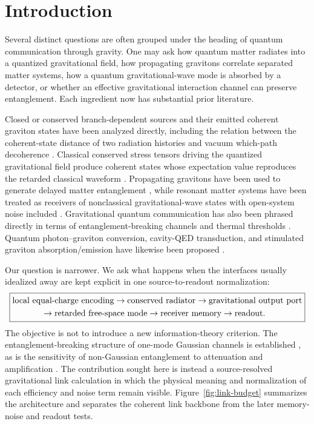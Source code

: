 \section{Introduction}

Several distinct questions are often grouped under the heading of quantum communication through gravity. One may ask how quantum matter radiates into a quantized gravitational field, how propagating gravitons correlate separated matter systems, how a quantum gravitational-wave mode is absorbed by a detector, or whether an effective gravitational interaction channel can preserve entanglement. Each ingredient now has substantial prior literature.

Closed or conserved branch-dependent sources and their emitted coherent graviton states have been analyzed directly, including the relation between the coherent-state distance of two radiation histories and vacuum which-path decoherence \cite{Matsui2026}. Classical conserved stress tensors driving the quantized gravitational field produce coherent states whose expectation value reproduces the retarded classical waveform \cite{LagaSuyama2026}. Propagating gravitons have been used to generate delayed matter entanglement \cite{TrengganaZen2026}, while resonant matter systems have been treated as receivers of nonclassical gravitational-wave states with open-system noise included \cite{ToccaceloEtAl2026,TobarEtAl2024}. Gravitational quantum communication has also been phrased directly in terms of entanglement-breaking channels and thermal thresholds \cite{MariEtAl2026,ToccaceloAndersenBrask2025,MikiLiChen2026}. Quantum photon--graviton conversion, cavity-QED transduction, and stimulated graviton absorption/emission have likewise been proposed \cite{IkedaEtAl2025,AraniLamineSoda2026,Schutzhold2025}.

Our question is narrower. We ask what happens when the interfaces usually idealized away are kept explicit in one source-to-readout normalization:
\begin{equation}
\boxed{
\begin{aligned}
&\text{local equal-charge encoding}
\to
\text{conserved radiator}
\to
\text{gravitational output port}\\
&\hspace{1.2cm}\to
\text{retarded free-space mode}
\to
\text{receiver memory}
\to
\text{readout}.
\end{aligned}}
\label{eq:chain}
\end{equation}
The objective is not to introduce a new information-theory criterion. The entanglement-breaking structure of one-mode Gaussian channels is established \cite{Holevo2008EB}, as is the sensitivity of non-Gaussian entanglement to attenuation and amplification \cite{FilippovZiman2014}. The contribution sought here is instead a source-resolved gravitational link calculation in which the physical meaning and normalization of each efficiency and noise term remain visible. Figure~\ref{fig:link-budget} summarizes the architecture and separates the coherent link backbone from the later memory-noise and readout tests.

